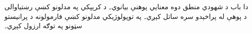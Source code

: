 \documentclass[../../../include/open-logic-chapter]{subfiles}
\begin{document}

\begin{editorial}
  دا باب د شهودي منطق دوه معنايي پوهنې بيانوي۔ د کرېپکي په
  مدلونو کښې رښتياوالی د پوهې له پراخېدو سره ساتل کېږي۔ په
  توپولوژيکي مدلونو کښې فارمولونه د پرانيستو سټونو په توګه ارزول کېږي۔
\end{editorial}


\OLEndChapterHook
\end{document}
